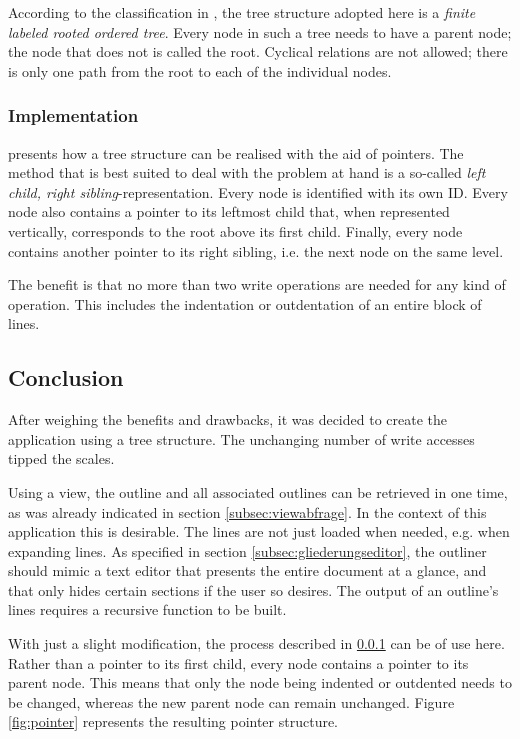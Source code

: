 According to the classification in , the tree structure adopted here is a \textit{finite labeled rooted ordered tree}. Every node in such a tree needs to have a parent node; the node that does not is called the root. Cyclical relations are not allowed; there is only one path from the root to each of the individual nodes.

\subsubsection{Implementation}
\label{subsec:baumumsetzung}

 presents how a tree structure can be realised with the aid of pointers. The method that is best suited to deal with the problem at hand is a so-called \textit{left child, right sibling}-representation. Every node is identified with its own ID. Every node also contains a pointer to its leftmost child that, when represented vertically, corresponds to the root above its first child. Finally, every node contains another pointer to its right sibling, i.e. the next node on the same level.

The benefit is that no more than two write operations are needed for any kind of operation. This includes the indentation or outdentation of an entire block of lines.

\subsection{Conclusion}

After weighing the benefits and drawbacks, it was decided to create the application using a tree structure. The unchanging number of write accesses tipped the scales.

Using a view, the outline and all associated outlines can be retrieved in one time, as was already indicated in section \ref{subsec:viewabfrage}. In the context of this application this is desirable. The lines are not just loaded when needed, e.g. when expanding lines. As specified in section \ref{subsec:gliederungseditor}, the outliner should mimic a text editor that presents the entire document at a glance, and that only hides certain sections if the user so desires. The output of an outline's lines requires a recursive function to be built.

With just a slight modification, the process described in \ref{subsec:baumumsetzung} can be of use here. Rather than a pointer to its first child, every node contains a pointer to its parent node. This means that only the node being indented or outdented needs to be changed, whereas the new parent node can remain unchanged. Figure \ref{fig:pointer} represents the resulting pointer structure.

